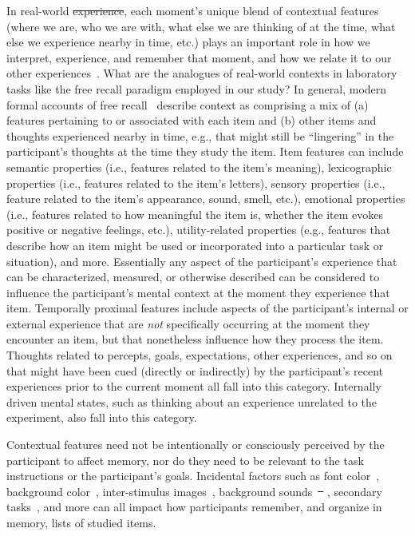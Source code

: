 \documentclass[11pt]{article}
\providecommand{\DIFaddtex}[1]{{\protect\color{blue}\uwave{#1}}} %
\providecommand{\DIFdeltex}[1]{{\protect\color{red}\sout{#1}}}                      %
\providecommand{\DIFaddbegin}{} %
\providecommand{\DIFaddend}{} %
\providecommand{\DIFdelbegin}{} %
\providecommand{\DIFdelend}{} %
\providecommand{\DIFadd}[1]{\texorpdfstring{\DIFaddtex{#1}}{#1}} %
\providecommand{\DIFdel}[1]{\texorpdfstring{\DIFdeltex{#1}}{}} %
\newcommand{\DIFscaledelfig}{0.5}
\newlength{\DIFdelgraphicswidth} %
\newlength{\DIFdelgraphicsheight} %
\newcommand{\DIFaddincludegraphics}[2][]{{\color{blue}\fbox{\DIFOincludegraphics[#1]{#2}}}} %
\newcommand{\DIFdelincludegraphics}[2][]{%
\sbox{\DIFdelgraphicsbox}{\DIFOincludegraphics[#1]{#2}}%
\settoboxwidth{\DIFdelgraphicswidth}{\DIFdelgraphicsbox} %
\settoboxtotalheight{\DIFdelgraphicsheight}{\DIFdelgraphicsbox} %
\scalebox{\DIFscaledelfig}{%
\parbox[b]{\DIFdelgraphicswidth}{\usebox{\DIFdelgraphicsbox}\\[-\baselineskip] \rule{\DIFdelgraphicswidth}{0em}}\llap{\resizebox{\DIFdelgraphicswidth}{\DIFdelgraphicsheight}{%
\setlength{\unitlength}{\DIFdelgraphicswidth}%
\begin{picture}(1,1)%
\thicklines\linethickness{2pt} %
{\color[rgb]{1,0,0}\put(0,0){\framebox(1,1){}}}%
{\color[rgb]{1,0,0}\put(0,0){\line( 1,1){1}}}%
{\color[rgb]{1,0,0}\put(0,1){\line(1,-1){1}}}%
\end{picture}%
}\hspace*{3pt}}} %
} %
\DeclareRobustCommand{\DIFaddbegin}{\DIFOaddbegin \let\includegraphics\DIFaddincludegraphics} %
\DeclareRobustCommand{\DIFaddend}{\DIFOaddend \let\includegraphics\DIFOincludegraphics} %
\DeclareRobustCommand{\DIFdelbegin}{\DIFOdelbegin \let\includegraphics\DIFdelincludegraphics} %
\DeclareRobustCommand{\DIFdelend}{\DIFOaddend \let\includegraphics\DIFOincludegraphics} %
\begin{document}
In real-world \DIFdelbegin \DIFdel{experience}\DIFdelend \DIFaddbegin \DIFadd{experiences}\DIFaddend , each moment's unique blend of contextual features
(where we are, who we are with, what else we are thinking of at the time, what
else we experience nearby in time, etc.) plays an important role in how we
interpret, experience, and remember that moment, and how we relate it to our
other experiences~\citep[e.g., for review see ][]{Mann20}. What are the
analogues of real-world contexts in laboratory tasks like the free recall
paradigm employed in our study? In general, modern formal accounts of free
recall~\citep{Kaha20} describe context as comprising a mix of (a) features
pertaining to or associated with each item and (b) other items and thoughts
experienced nearby in time, e.g., that might still be ``lingering'' in the
participant's thoughts at the time they study the item. Item features can
include semantic properties (i.e., features related to the item's meaning),
lexicographic properties (i.e., features related to the item's letters),
sensory properties (i.e., feature related to the item's appearance, sound,
smell, etc.), emotional properties (i.e., features related to how meaningful
the item is, whether the item evokes positive or negative feelings, etc.),
utility-related properties (e.g., features that describe how an item might be
used or incorporated into a particular task or situation), and more.
Essentially any aspect of the participant's experience that can be
characterized, measured, or otherwise described can be considered to influence
the participant's mental context at the moment they experience that item.
Temporally proximal features include aspects of the participant's internal or
external experience that are \textit{not} specifically occurring at the moment
they encounter an item, but that nonetheless influence how they process the
item. Thoughts related to percepts, goals, expectations, other experiences, and
so on that might have been cued (directly or indirectly) by the participant's
recent experiences prior to the current moment all fall into this category.
Internally driven mental states, such as thinking about an experience unrelated
to the experiment, also fall into this category.

Contextual features need not be intentionally or consciously perceived by the
participant to affect memory, nor do they need to be relevant to the task
instructions or the participant's goals. Incidental factors such as font
color~\citep{JonePyc14}, background color~\citep{IsarIsar07}, inter-stimulus
images~\citep{GersEtal13, MannEtal16, ChiuEtal21}, background
sounds~\DIFdelbegin \DIFdel{\mbox{%
\citep{BeamJone10, SahaSmit14}}\hskip0pt%
}\DIFdelend \DIFaddbegin \DIFadd{\mbox{%
\citep{BeamJone98, SahaSmit14}}\hskip0pt%
}\DIFaddend , secondary tasks~\citep{MasiSaha14,
PolyEtal09, OberLewa08}, and more can all impact how participants remember, and
organize in memory, lists of studied items.
\end{document}
